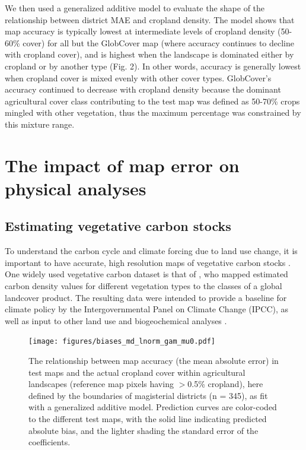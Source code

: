 \documentclass{pnastwo}
\begin{document}
\begin{article}
We then used a generalized additive model to evaluate the shape of the relationship between district MAE and cropland density. The model shows that map accuracy is typically lowest at intermediate levels of cropland density (50-60\% cover) for all but the GlobCover map (where accuracy continues to decline with cropland cover), and is highest when the landscape is dominated either by cropland or by another type (Fig. 2). In other words, accuracy is generally lowest when cropland cover is mixed evenly with other cover types. GlobCover's accuracy continued to decrease with cropland density because the dominant agricultural cover class contributing to the test map was defined as 50-70\% crops mingled with other vegetation, thus the maximum percentage was constrained by this mixture range.  

\section{The impact of map error on physical analyses}
\subsection{Estimating vegetative carbon stocks}
To understand the carbon cycle and climate forcing due to land use change, it is important to have accurate, high resolution maps of vegetative carbon stocks \cite[][]{searchinger_high_2015}. One widely used vegetative carbon dataset is that of \cite{ruesch_new_2008}, who mapped estimated carbon density values for different vegetation types to the classes of a global landcover product. The resulting data were intended to provide a baseline for climate policy by the Intergovernmental Panel on Climate Change (IPCC), as well as input to other land use and biogeochemical analyses \cite{ruesch_new_2008}. 

\begin{figure}[!h]
\centerline{\texttt{[image: figures/biases\_md\_lnorm\_gam\_mu0.pdf]}}
\caption{The relationship between map accuracy (the mean absolute error) in test maps and the actual cropland cover within agricultural landscapes (reference map pixels having $>$0.5\% cropland), here defined by the boundaries of magisterial districts (n = 345), as fit with a generalized additive model. Prediction curves are color-coded to the different test maps, with the solid line indicating predicted absolute bias, and the lighter shading the standard error of the coefficients.}\label{afoto2}
\end{figure}


\end{article}
\end{document}
